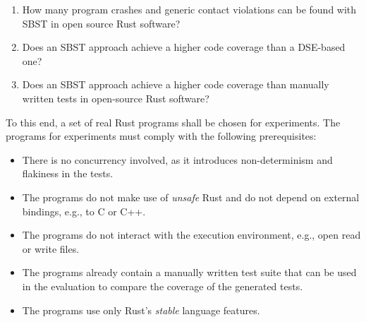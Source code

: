\documentclass{article}
\begin{document}

\begin{enumerate}[start=1, label={\bfseries RQ\arabic*:}]
    \item How many program crashes and generic contact violations can be found with \ac{SBST} in open source Rust software?
    \item Does an \ac{SBST} approach achieve a higher code coverage than a \ac{DSE}-based one?
    \item Does an \ac{SBST} approach achieve a higher code coverage than manually written tests in open-source Rust software?
\end{enumerate}
To this end, a set of real Rust programs shall be chosen for experiments. The programs for experiments must comply with the following prerequisites:
\begin{itemize}
    \item There is no concurrency involved, as it introduces non-determinism and flakiness in the tests.
    \item The programs do not make use of \textit{unsafe} Rust and do not depend on external bindings, e.g., to C or C++.
    \item The programs do not interact with the execution environment, e.g., open read or write files.
    \item The programs already contain a manually written test suite that can be used in the evaluation to compare the coverage of the generated tests.
    \item The programs use only Rust's \textit{stable} language features.
\end{itemize}
\end{document}
